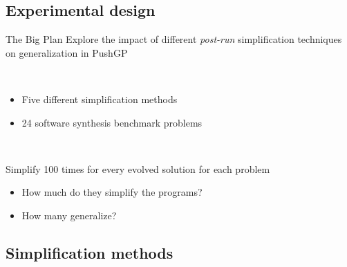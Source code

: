 \documentclass{beamer}
\begin{document}
\subsection{Experimental design}

\begin{frame}{The Big Plan}
Explore the impact of different \emph{post-run} simplification techniques on generalization in PushGP 

~

\begin{itemize}
	\item Five different simplification methods
	\item 24 software synthesis benchmark problems
\end{itemize}

~ 

Simplify 100 times for every evolved solution for each problem
\begin{itemize}
	\item How much do they simplify the programs?
	\item How many generalize?
\end{itemize} 

\end{frame}

\subsection{Simplification methods}
\end{document}
